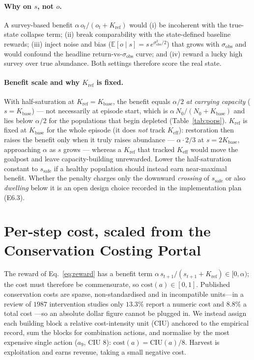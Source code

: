\documentclass[11pt]{article}
\newcommand{\Keff}{K_{\mathrm{eff}}}
\newcommand{\Kbase}{K_{\mathrm{base}}}
\newcommand{\Kref}{K_{\mathrm{ref}}}
\newcommand{\sobs}{\sigma_{\mathrm{obs}}}
\newcommand{\ssafe}{s_{\mathrm{safe}}}
\begin{document}
\paragraph{Why on $s$, not $o$.} A survey-based benefit $\alpha\,o_t/(o_t+\Kref)$ would
(i) be incoherent with the true-state collapse term; (ii) break comparability with the
state-defined baseline rewards; (iii) inject noise and bias
($\mathbb{E}[o\mid s]{=}s\,e^{\sobs^2/2}$) that grows with $\sobs$ and would confound the
headline return-vs-$\sobs$ curve; and (iv) reward a lucky high survey over true
abundance. Both settings therefore score the real state.

\paragraph{Benefit scale and why $\Kref$ is fixed.} With half-saturation at
$\Kref{=}\Kbase$, the benefit equals $\alpha/2$ \emph{at carrying capacity}
($s{=}\Kbase$) --- not necessarily at episode start, which is
$\alpha\,N_0/(N_0{+}\Kbase)$ and lies below $\alpha/2$ for the populations that begin
depleted (Table~\ref{tab:pops}). $\Kref$ is fixed at $\Kbase$ for the whole episode (it
does \emph{not} track $\Keff$): restoration then raises the benefit only when it truly
raises abundance --- $\alpha\cdot2/3$ at $s{=}2\Kbase$, approaching $\alpha$ as $s$
grows --- whereas a $\Kref$ that tracked $\Keff$ would move the goalpost and leave
capacity-building unrewarded. Lower the half-saturation constant to $\ssafe$ if a
healthy population should instead earn near-maximal benefit. Whether the penalty charges
only the downward \emph{crossing} of $\ssafe$ or also \emph{dwelling} below it is an open
design choice recorded in the implementation plan (E6.3).

\section{Per-step cost, scaled from the Conservation Costing Portal}
\label{sec:cost}
The reward of Eq.~\ref{eq:reward} has a benefit term
$\alpha\,s_{t+1}/(s_{t+1}+\Kref)\in[0,\alpha)$; the cost must therefore be commensurate,
so $\mathrm{cost}(a)\in[0,1]$. Published conservation costs are sparse, non-standardised
and in incompatible units---in a review of $1987$ intervention studies only
$13.3\%$ report a numeric cost and $8.8\%$ a total cost \cite{white2022}---so an
absolute dollar figure cannot be plugged in. We instead assign each building block a
relative cost-intensity unit (CIU) anchored to the empirical record, sum the blocks
for combination actions, and normalise by the most expensive single action
($a_9$, CIU $8$): $\mathrm{cost}(a)=\mathrm{CIU}(a)/8$. Harvest is exploitation and
earns revenue, taking a small negative cost.
\end{document}
